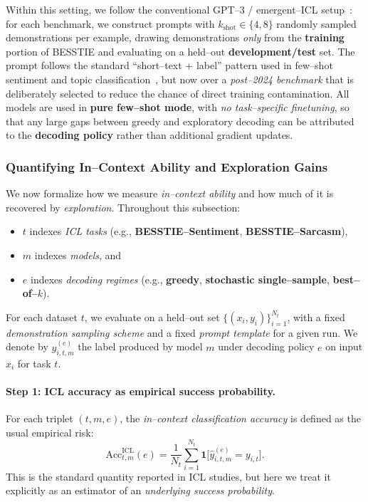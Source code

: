 Within this setting, we follow the conventional GPT--3 / emergent--ICL
setup~\citep{brown2020language,wei2022emergent}: for each benchmark, we
construct prompts with $k_{\text{shot}}\in\{4,8\}$ randomly sampled
demonstrations per example, drawing demonstrations \emph{only} from the
\textbf{training} portion of BESSTIE and evaluating on a held--out
\textbf{development/test} set. The prompt follows the standard
``short--text + label'' pattern used in few--shot sentiment and topic
classification~\citep{socher2013sst,zhang2015character}, but now over a
\emph{post--2024 benchmark} that is deliberately selected to reduce the
chance of direct training contamination. All models are used in
\textbf{pure few--shot mode}, with \emph{no task--specific finetuning},
so that any large gaps between greedy and exploratory decoding can be
attributed to the \textbf{decoding policy} rather than additional
gradient updates.



\subsubsection{Quantifying In--Context Ability and Exploration Gains}
\label{subsec:icl-metrics}

We now formalize how we measure \emph{in--context ability} and how much of it
is recovered by \emph{exploration}. Throughout this subsection:
\begin{itemize}[leftmargin=1.5em]
  \item $t$ indexes \emph{ICL tasks} (e.g., \textbf{BESSTIE--Sentiment},
        \textbf{BESSTIE--Sarcasm}),
  \item $m$ indexes \emph{models}, and
  \item $e$ indexes \emph{decoding regimes} (e.g., \textbf{greedy},
        \textbf{stochastic single--sample}, \textbf{best--of--$k$}).
\end{itemize}
For each dataset $t$, we evaluate on a held--out set
$\{(x_i,y_i)\}_{i=1}^{N_t}$, with a fixed \emph{demonstration sampling scheme}
and a fixed \emph{prompt template} for a given run. We denote by
$\hat{y}^{(e)}_{i,t,m}$ the label produced by model $m$ under decoding
policy $e$ on input $x_i$ for task $t$.

\vspace{0.3em}
\paragraph{\textbf{Step 1: ICL accuracy as empirical success probability.}}
For each triplet $(t,m,e)$, the \emph{in--context classification accuracy} is
defined as the usual empirical risk:
\[
\mathrm{Acc}^{\text{ICL}}_{t,m}(e)
= \frac{1}{N_t} \sum_{i=1}^{N_t}
  \mathbf{1}\big[ \hat{y}^{(e)}_{i,t,m} = y_{i,t} \big].
\]
This is the standard quantity reported in ICL studies, but here we treat it
explicitly as an estimator of an \emph{underlying success probability}.

